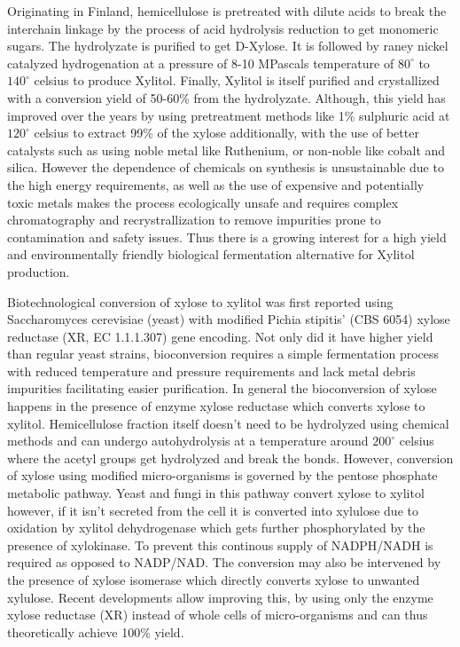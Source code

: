 \documentclass{main}
\begin{document}
Originating in Finland, hemicellulose is pretreated with dilute acids to break the interchain linkage by the process of acid hydrolysis reduction to get monomeric sugars. The hydrolyzate is purified to get D-Xylose. It is followed by raney nickel catalyzed hydrogenation at a pressure of 8-10 MPascals temperature of $80^{\circ}$ to $140^{\circ}$ celsius to produce Xylitol. Finally, Xylitol is itself purified and crystallized with a conversion yield of 50-60\% from the hydrolyzate. Although, this yield has improved over the years by using pretreatment methods like 1\% sulphuric acid at $120^{\circ}$ celsius to extract 99\% of the xylose additionally, with the use of better catalysts such as using noble metal like Ruthenium, or non-noble like cobalt and silica. However the dependence of chemicals on synthesis is unsustainable due to the high energy requirements, as well as the use of expensive and potentially toxic metals makes the process ecologically unsafe and requires complex chromatography and recrystrallization to remove impurities prone to contamination and safety issues. Thus there is a growing interest for a high yield and environmentally friendly biological fermentation alternative for Xylitol production.


Biotechnological conversion of xylose to xylitol was first reported using Saccharomyces cerevisiae (yeast) with modified Pichia stipitis' (CBS 6054) xylose reductase (XR, EC 1.1.1.307) gene encoding. Not only did it have higher yield than regular yeast strains, bioconversion requires a simple fermentation process with reduced temperature and pressure requirements and lack metal debris impurities facilitating easier purification. In general the bioconversion of xylose happens in the presence of enzyme xylose reductase which converts xylose to xylitol. Hemicellulose fraction itself doesn't need to be hydrolyzed using chemical methods and can undergo autohydrolysis at a temperature around $200^{\circ}$ celsius where the acetyl groups get hydrolyzed and break the bonds. However, conversion of xylose using modified micro-organisms is governed by the pentose phosphate metabolic pathway. Yeast and fungi in this pathway convert xylose to xylitol however, if it isn't secreted from the cell it is converted into xylulose due to oxidation by xylitol dehydrogenase which gets further phosphorylated by the presence of xylokinase. To prevent this continous supply of NADPH/NADH is required as opposed to NADP/NAD. The conversion may also be intervened by the presence of xylose isomerase which directly converts xylose to unwanted xylulose. Recent developments allow improving this, by using only the enzyme xylose reductase (XR) instead of whole cells of micro-organisms and can thus theoretically achieve 100\% yield.
\end{document}
